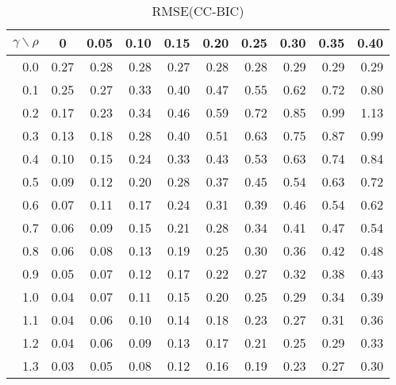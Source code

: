 \documentclass[12pt]{article}
\begin{document}
%
\begin{table}[!tbp]
\caption{RMSE(CC-BIC)}
 \begin{center}
 \begin{tabular}{r|rrrrrrrrr}\hline\hline
\multicolumn{1}{c|}{$\gamma\backslash\rho$}&\multicolumn{1}{c}{0}&\multicolumn{1}{c}{0.05}&\multicolumn{1}{c}{0.10}&\multicolumn{1}{c}{0.15}&\multicolumn{1}{c}{0.20}&\multicolumn{1}{c}{0.25}&\multicolumn{1}{c}{0.30}&\multicolumn{1}{c}{0.35}&\multicolumn{1}{c}{0.40}\tabularnewline
\hline
0.0&0.27&0.28&0.28&0.27&0.28&0.28&0.29&0.29&0.29\tabularnewline
0.1&0.25&0.27&0.33&0.40&0.47&0.55&0.62&0.72&0.80\tabularnewline
0.2&0.17&0.23&0.34&0.46&0.59&0.72&0.85&0.99&1.13\tabularnewline
0.3&0.13&0.18&0.28&0.40&0.51&0.63&0.75&0.87&0.99\tabularnewline
0.4&0.10&0.15&0.24&0.33&0.43&0.53&0.63&0.74&0.84\tabularnewline
0.5&0.09&0.12&0.20&0.28&0.37&0.45&0.54&0.63&0.72\tabularnewline
0.6&0.07&0.11&0.17&0.24&0.31&0.39&0.46&0.54&0.62\tabularnewline
0.7&0.06&0.09&0.15&0.21&0.28&0.34&0.41&0.47&0.54\tabularnewline
0.8&0.06&0.08&0.13&0.19&0.25&0.30&0.36&0.42&0.48\tabularnewline
0.9&0.05&0.07&0.12&0.17&0.22&0.27&0.32&0.38&0.43\tabularnewline
1.0&0.04&0.07&0.11&0.15&0.20&0.25&0.29&0.34&0.39\tabularnewline
1.1&0.04&0.06&0.10&0.14&0.18&0.23&0.27&0.31&0.36\tabularnewline
1.2&0.04&0.06&0.09&0.13&0.17&0.21&0.25&0.29&0.33\tabularnewline
1.3&0.03&0.05&0.08&0.12&0.16&0.19&0.23&0.27&0.30\tabularnewline
\hline
\end{tabular}

\end{center}

\end{table}
\end{document}
